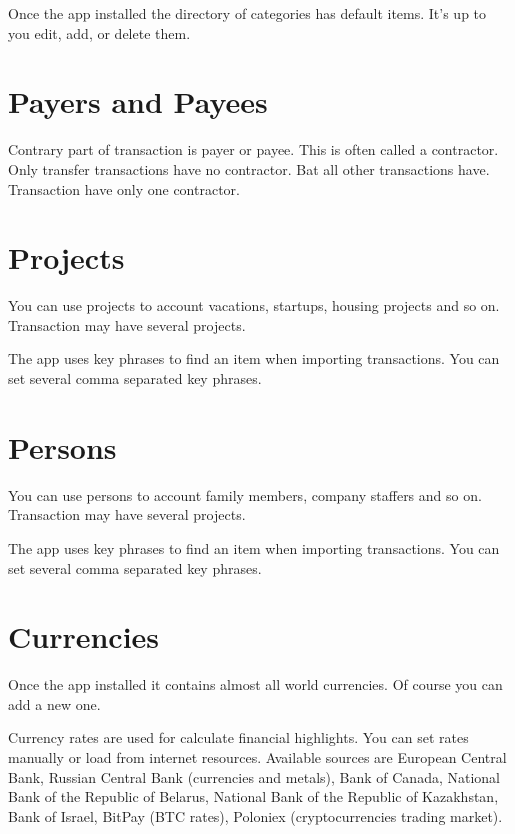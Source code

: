 \documentclass[a4paper,10pt,english]{sphinxmanual}
\begin{document}
Once the app installed the directory of categories has default items. It’s up to you edit, add, or delete them.


\section{Payers and Payees}
\label{\detokenize{directories:payers-and-payees}}
Contrary part of transaction is payer or payee. This is often called a contractor. Only transfer transactions
have no contractor. Bat all other transactions have. Transaction have only one contractor.


\section{Projects}
\label{\detokenize{directories:projects}}
You can use projects to account vacations, startups, housing projects and so on.
Transaction may have several projects.

The app uses key phrases to find an item when importing transactions. You can set several
comma separated key phrases.


\section{Persons}
\label{\detokenize{directories:persons}}
You can use persons to account family members, company staffers and so on.
Transaction may have several projects.

The app uses key phrases to find an item when importing transactions. You can set several
comma separated key phrases.

\noindent{}

\noindent{}

\noindent{}


\section{Currencies}
\label{\detokenize{directories:currencies}}
Once the app installed it contains almost all world currencies. Of course you can add a new one.

Currency rates are used for calculate financial highlights. You can set rates manually
or load from internet resources. Available sources are European Central Bank,
Russian Central Bank (currencies and metals), Bank of Canada, National Bank of the Republic of Belarus,
National Bank of the Republic of Kazakhstan, Bank of Israel, BitPay (BTC rates), Poloniex (cryptocurrencies trading market).
\end{document}
